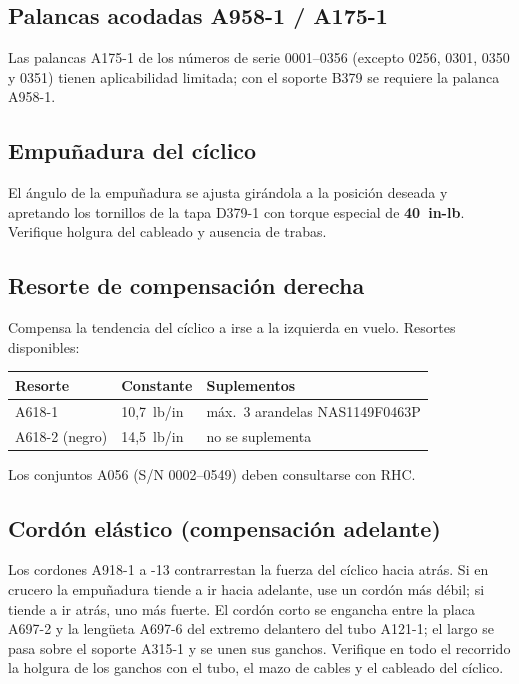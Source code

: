 \subsection{Palancas acodadas A958-1 / A175-1}

Las palancas A175-1 de los números de serie 0001--0356 (excepto 0256, 0301, 0350 y 0351) tienen aplicabilidad limitada; con el soporte B379 se requiere la palanca A958-1.

\subsection{Empuñadura del cíclico}

El ángulo de la empuñadura se ajusta girándola a la posición deseada y apretando los tornillos de la tapa D379-1 con torque especial de \textbf{40~in-lb}. Verifique holgura del cableado y ausencia de trabas.

\subsection{Resorte de compensación derecha}

Compensa la tendencia del cíclico a irse a la izquierda en vuelo. Resortes disponibles:

\begin{center}
\begin{tabularx}{\linewidth}{@{}llX@{}}
\toprule
Resorte & Constante & Suplementos \\
\midrule
A618-1 & 10,7~lb/in & máx.\ 3 arandelas NAS1149F0463P \\
A618-2 (negro) & 14,5~lb/in & no se suplementa \\
\bottomrule
\end{tabularx}
\end{center}

Los conjuntos A056 (S/N 0002--0549) deben consultarse con RHC.

\subsection{Cordón elástico (compensación adelante)}

Los cordones A918-1 a -13 contrarrestan la fuerza del cíclico hacia atrás. Si en crucero la empuñadura tiende a ir hacia adelante, use un cordón más débil; si tiende a ir atrás, uno más fuerte. El cordón corto se engancha entre la placa A697-2 y la lengüeta A697-6 del extremo delantero del tubo A121-1; el largo se pasa sobre el soporte A315-1 y se unen sus ganchos. Verifique en todo el recorrido la holgura de los ganchos con el tubo, el mazo de cables y el cableado del cíclico.

